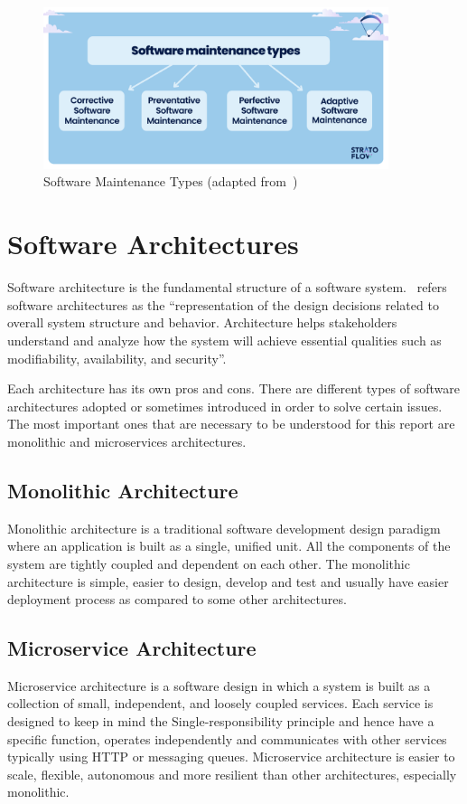 \begin{figure}[H]
    \centering
    \includegraphics[width=0.9\textwidth]{figures/se_maintenance.png}
    \caption[Software Maintenance Types]{Software Maintenance Types (adapted from~\cite{stratoflow2025})}
	\label{fig_se_maintenance}
\end{figure}

\section{Software Architectures}
Software architecture is the fundamental structure of a software system.~\citep{sei_software_architecture} refers software architectures as the ``representation of the design decisions related to overall system structure and behavior. Architecture helps stakeholders understand and analyze how the system will achieve essential qualities such as modifiability, availability, and security''.

Each architecture has its own pros and cons. There are different types of software architectures adopted or sometimes introduced in order to solve certain issues. The most important ones that are necessary to be understood for this report are monolithic and microservices architectures.

\subsection{Monolithic Architecture}
Monolithic architecture is a traditional software development design paradigm where an application is built as a single, unified unit. All the components of the system are tightly coupled and dependent on each other. The monolithic architecture is simple, easier to design, develop and test and usually have easier deployment process as compared to some other architectures.

\subsection{Microservice Architecture}
Microservice architecture is a software design in which a system is built as a collection of small, independent, and loosely coupled services. Each service is designed to keep in mind the Single-responsibility principle and hence have a specific function, operates independently and communicates with other services typically using HTTP or messaging queues. Microservice architecture is easier to scale, flexible, autonomous and more resilient than other architectures, especially monolithic. 


